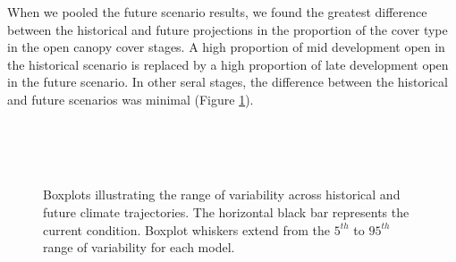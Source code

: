 \documentclass[12pt]{article}
\begin{document}
\begin{spacing}{1}
When we pooled the future scenario results, we found the greatest difference between the historical and future projections in the proportion of the cover type in the open canopy cover stages. A high proportion of mid development open in the historical scenario is replaced by a high proportion of late development open in the future scenario. In other seral stages, the difference between the historical and future scenarios was minimal (Figure \ref{fig:covcond_smcx}).

\begin{figure}[htbp]
  \centering
  \qquad
   \\
  \qquad
   \\
       \\
  \qquad
    \qquad 
    \caption{Boxplots illustrating the range of variability across historical and future climate trajectories. The horizontal black bar represents the current condition. Boxplot whiskers extend from the $5^{th}$ to $95^{th}$ range of variability for each model. }
  \label{fig:covcond_smcx}
\end{figure} %




\end{spacing}
\end{document}
